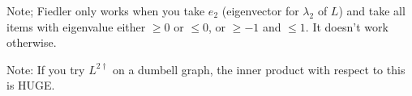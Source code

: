 Note; Fiedler only works when you take $e_2$ (eigenvector for
    $\lambda_2$ of $L$) and take all
items with eigenvalue either $ \geq 0$ or $ \leq 0$, or $\geq -1$
and $\leq 1$. It doesn't work otherwise.

Note: If you try $L^{2\dag}$ on a dumbell graph, the inner
product with respect to this is HUGE.
